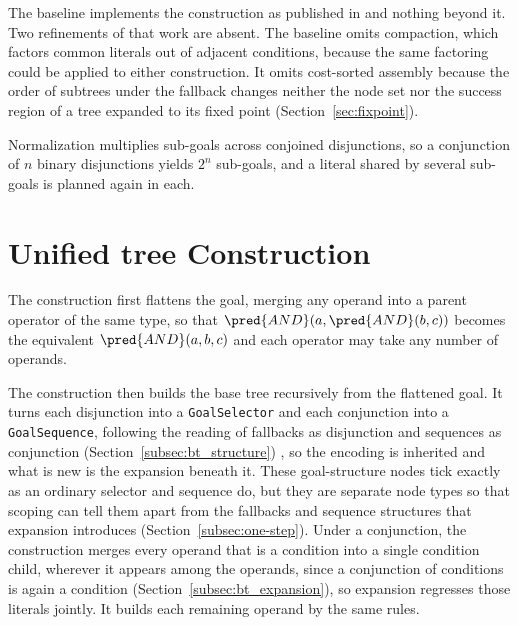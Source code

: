     The baseline implements the construction as published in \cite{chen2024} and nothing beyond it.
    Two refinements of that work are absent.
    The baseline omits compaction, which factors common literals out of adjacent conditions, because the same factoring could be applied to either construction.
    It omits cost-sorted assembly because the order of subtrees under the fallback changes neither the node set nor the success region of a tree expanded to its fixed point (Section~\ref{sec:fixpoint}).

    Normalization multiplies sub-goals across conjoined disjunctions, so a conjunction of $n$ binary disjunctions yields $2^n$ sub-goals, and a literal shared by several sub-goals is planned again in each.
    
\section{Unified tree Construction}
\label{sec:unified_construction}
    The construction first flattens the goal, merging any operand into a parent operator of the same type, so that $\pred{AND}(a, \pred{AND}(b, c))$ becomes the equivalent $\pred{AND}(a, b, c)$ and each operator may take any number of operands.

    

    The construction then builds the base tree recursively from the flattened goal.
    It turns each disjunction into a \texttt{GoalSelector} and each conjunction into a \texttt{GoalSequence}, following the reading of fallbacks as disjunction and sequences as conjunction (Section~\ref{subsec:bt_structure}) \cite{colledanchise2016tr}, so the encoding is inherited and what is new is the expansion beneath it.
    These goal-structure nodes tick exactly as an ordinary selector and sequence do, but they are separate node types so that scoping can tell them apart from the fallbacks and sequence structures that expansion introduces (Section~\ref{subsec:one-step}).
    Under a conjunction, the construction merges every operand that is a condition into a single condition child, wherever it appears among the operands, since a conjunction of conditions is again a condition (Section~\ref{subsec:bt_expansion}), so expansion regresses those literals jointly.
    It builds each remaining operand by the same rules.

